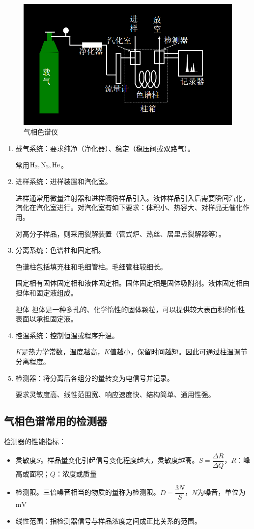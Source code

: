 \begin{figure}[!h]
	\centering
	\includegraphics[width=0.7\linewidth]{image/chp1_GC_apa}
	\caption{气相色谱仪}
	\label{fig:chp1gcapa}
\end{figure}
\begin{enumerate}
	\item 载气系统：要求纯净（净化器）、稳定（稳压阀或双路气）。
	
	常用$\ce{H2,N2,He}$。
	\item 进样系统：进样装置和汽化室。
	
	进样通常用微量注射器和进样阀将样品引入。液体样品引入后需要瞬间汽化，汽化在汽化室进行。对汽化室有如下要求：体积小、热容大、对样品无催化作用。
	
	对高分子样品，则采用裂解装置（管式炉、热丝、居里点裂解器等）。
	\item 分离系统：色谱柱和固定相。
	
	色谱柱包括填充柱和毛细管柱。毛细管柱较细长。
	
	固定相有固体固定相和液体固定相。固体固定相是固体吸附剂。液体固定相由担体和固定液组成。
	
	\begin{definition*}{担体}{}
		担体是一种多孔的、化学惰性的固体颗粒，可以提供较大表面积的惰性表面以承担固定液。
	\end{definition*}
	\item 控温系统：控制恒温或程序升温。
	
	$K$是热力学常数，温度越高，$K$值越小，保留时间越短。因此可通过柱温调节分离程度。
	\item 检测器：将分离后各组分的量转变为电信号并记录。
	
	要求灵敏度高、线性范围宽、响应速度快、结构简单、通用性强。
\end{enumerate}

\subsection{气相色谱常用的检测器}
检测器的性能指标：
\begin{itemize}
	\item 灵敏度$S$。样品量变化引起信号变化程度越大，灵敏度越高。$S=\dfrac{\Delta R}{\Delta  Q}$，$R$：峰高或面积；$Q$：浓度或质量
	\item 检测限。三倍噪音相当的物质的量称为检测限。$D=\dfrac{3N}{S}$，$N$为噪音，单位为$\mathrm{mV}$
	\item 线性范围：指检测器信号与样品浓度之间成正比关系的范围。
\end{itemize}

